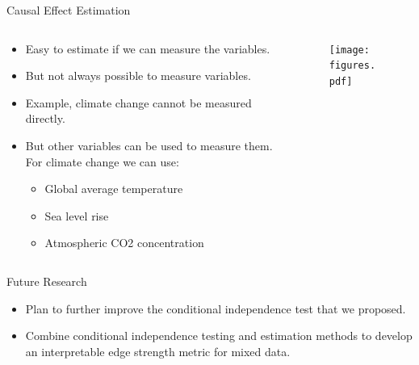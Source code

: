 \documentclass[aspectratio=169]{beamer}
\begin{document}
\begin{frame}{Causal Effect Estimation}
	\begin{columns}
		\begin{column}{0.65 \textwidth}
			\begin{itemize}
				\item Easy to estimate if we can measure the variables.
				\item But not always possible to measure variables.
				\item Example, climate change cannot be measured directly.
				\item But other variables can be used to measure them. For climate change we can use:
					\begin{itemize}
						\item Global average temperature
						\item Sea level rise
						\item Atmospheric CO2 concentration
					\end{itemize}
			\end{itemize}
		\end{column}
		\begin{column}{0.38 \textwidth}	
			\begin{figure}
				\center
				\texttt{[image: figures.pdf]}
			\end{figure}
		\end{column}
	\end{columns}

	\vspace{2em}
	
\end{frame}

\begin{frame}{Future Research}
	\begin{itemize}
		\item Plan to further improve the conditional independence test that we proposed.
		\item Combine conditional independence testing and estimation methods to develop an interpretable edge strength metric for mixed data.
	\end{itemize}
\end{frame}
\end{document}
